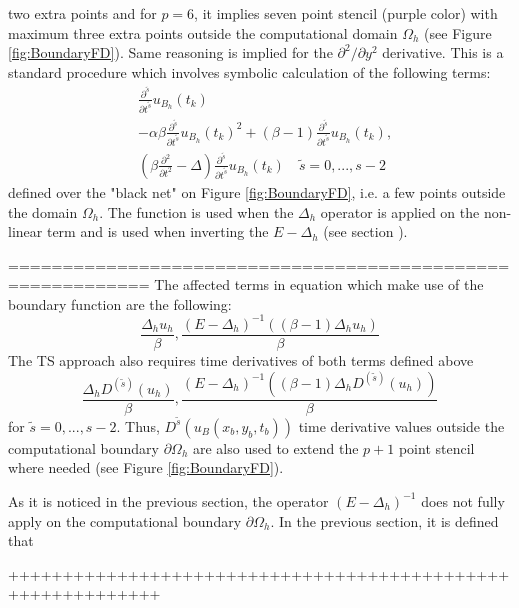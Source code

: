 \documentclass[11pt,a4paper,twoside]{article}
\begin{document}
two extra points and for $p=6$, it implies seven point stencil (purple color) with maximum three extra points outside the computational domain $\Omega_h$ (see Figure \ref{fig:BoundaryFD}). Same reasoning is implied for the $\partial^2 / \partial y^2$ derivative. This is a standard procedure which involves symbolic calculation of the following terms:
\begin{align}
& \frac{ \partial^{\tilde s} } { \partial t^{\tilde s} } u_{B_h}(t_k)
\\
& -\alpha \beta \frac{ \partial^{\tilde s} } { \partial t^{\tilde s} } u_{B_h}(t_k)^2  + (\beta -1)\frac{ \partial^{\tilde s} } { \partial t^{\tilde s} }u_{B_h}(t_k), \label{nonLinBnd}
\\
& (\beta \frac{ \partial^2 } { \partial t^2 } - \Delta)\frac{ \partial^{\tilde s} } { \partial t^{\tilde s} } u_{B_h}(t_k) \quad \tilde s = 0,...,s-2 \label{psnBnd}
\end{align}
defined over the "black net" on Figure \ref{fig:BoundaryFD}, i.e. a few points outside the domain $\Omega_h$. The function  is used when the $\Delta_h$ operator is applied on the non-linear term and  is used when inverting the $E - \Delta_h$ (see section ).
\iffalse

===========================================================
 The affected terms in equation  which make use of the boundary function  are the following:
\begin{equation*}
\frac{ \Delta_h u_h}{\beta}, \frac{ (E - \Delta_h)^{-1} ( (\beta -1)\Delta_h u_h) }{\beta}
\end{equation*}
The TS approach also requires time derivatives of both terms defined above
\begin{equation*}
\frac{ \Delta_h D^{(\tilde s)} (u_h)}{\beta}, \frac{ (E - \Delta_h)^{-1} ( (\beta -1)\Delta_h D^{(\tilde s)}(u_h) ) }{\beta}
\end{equation*}
for $\tilde s = 0, ..., s-2$.  Thus, $D^{\tilde s}(u_B(x_b , y_b, t_b))$  time derivative values outside the computational boundary $\partial \Omega_h$ are also used to extend the $p+1$ point stencil where needed (see Figure  \ref{fig:BoundaryFD}). 

As it is noticed in the previous section, the operator $(E - \Delta_h)^{-1}$ does not fully apply on the computational boundary $\partial \Omega_h$. In the previous section, it is defined that

++++++++++++++++++++++++++++++++++++++++++++++++++++++++++++
\end{document}
